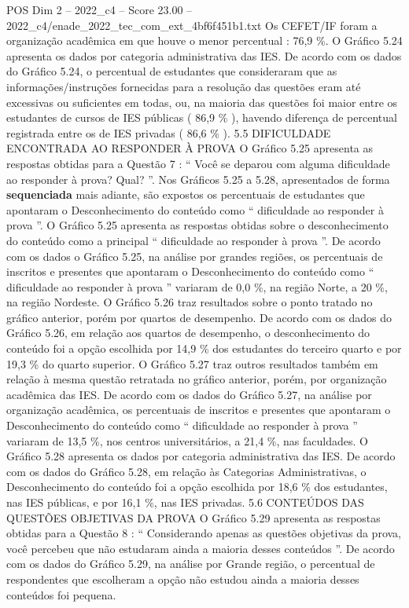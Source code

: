 \begin{textsample}{POS Dim 2 – 2022\_c4 – Score 23.00 – 2022\_c4/enade\_2022\_tec\_com\_ext\_4bf6f451b1.txt}
Os CEFET/IF foram a organização acadêmica em que houve o menor percentual : 76,9 \%.
O Gráfico 5.24 apresenta os dados por categoria administrativa das IES.
De acordo com os dados do Gráfico 5.24, o percentual de estudantes que consideraram que as informações/instruções fornecidas para a resolução das questões eram até excessivas ou suficientes em todas, ou, na maioria das questões foi maior entre os estudantes de cursos de IES públicas ( 86,9 \% ), havendo diferença de percentual registrada entre os de IES privadas ( 86,6 \% ). 5.5 DIFICULDADE ENCONTRADA AO RESPONDER À PROVA O Gráfico 5.25 apresenta as respostas obtidas para a Questão 7 : “ Você se deparou com alguma dificuldade ao responder à prova?
Qual? ”.
Nos Gráficos 5.25 a 5.28, apresentados de forma \textbf{sequenciada} mais adiante, são expostos os percentuais de estudantes que apontaram o Desconhecimento do conteúdo como “ dificuldade ao responder à prova ”.
O Gráfico 5.25 apresenta as respostas obtidas sobre o desconhecimento do conteúdo como a principal “ dificuldade ao responder à prova ”.
De acordo com os dados o Gráfico 5.25, na análise por grandes regiões, os percentuais de inscritos e presentes que apontaram o Desconhecimento do conteúdo como “ dificuldade ao responder à prova ” variaram de 0,0 \%, na região Norte, a 20 \%, na região Nordeste.
O Gráfico 5.26 traz resultados sobre o ponto tratado no gráfico anterior, porém por quartos de desempenho.
De acordo com os dados do Gráfico 5.26, em relação aos quartos de desempenho, o desconhecimento do conteúdo foi a opção escolhida por 14,9 \% dos estudantes do terceiro quarto e por 19,3 \% do quarto superior.
O Gráfico 5.27 traz outros resultados também em relação à mesma questão retratada no gráfico anterior, porém, por organização acadêmica das IES.
De acordo com os dados do Gráfico 5.27, na análise por organização acadêmica, os percentuais de inscritos e presentes que apontaram o Desconhecimento do conteúdo como “ dificuldade ao responder à prova ” variaram de 13,5 \%, nos centros universitários, a 21,4 \%, nas faculdades.
O Gráfico 5.28 apresenta os dados por categoria administrativa das IES.
De acordo com os dados do Gráfico 5.28, em relação às Categorias Administrativas, o Desconhecimento do conteúdo foi a opção escolhida por 18,6 \% dos estudantes, nas IES públicas, e por 16,1 \%, nas IES privadas. 5.6 CONTEÚDOS DAS QUESTÕES OBJETIVAS DA PROVA O Gráfico 5.29 apresenta as respostas obtidas para a Questão 8 : “ Considerando apenas as questões objetivas da prova, você percebeu que não estudaram ainda a maioria desses conteúdos ”.
De acordo com os dados do Gráfico 5.29, na análise por Grande região, o percentual de respondentes que escolheram a opção não estudou ainda a maioria desses conteúdos foi pequena.

\end{textsample}

